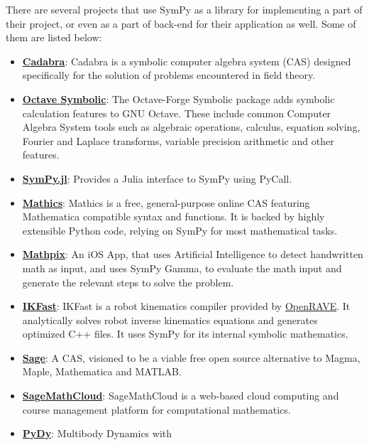 There are several projects that use SymPy as a library for implementing
a part of their project, or even as a part of back-end for their
application as well.
\newline
Some of them are listed below:

\begin{itemize}
\item
  \href{http://cadabra.science/index.html}{\textbf{Cadabra}}: Cadabra is
  a symbolic computer algebra system (CAS) designed specifically for the
  solution of problems encountered in field theory.
\item
  \href{http://octave.sourceforge.net/symbolic/}{\textbf{Octave Symbolic}}:
  The Octave-Forge Symbolic package adds symbolic calculation features
  to GNU Octave. These include common Computer Algebra System tools such
  as algebraic operations, calculus, equation solving, Fourier and
  Laplace transforms, variable precision arithmetic and other features.
\item
  \href{https://github.com/jverzani/SymPy.jl}{\textbf{SymPy.jl}}:
  Provides a Julia interface to SymPy using PyCall.
\item
  \href{https://mathics.github.io/}{\textbf{Mathics}}: Mathics is a
  free, general-purpose online CAS featuring Mathematica compatible
  syntax and functions. It is backed by highly extensible Python code,
  relying on SymPy for most mathematical tasks.
\item
  \href{http://mathpix.com/}{\textbf{Mathpix}}: An iOS App, that uses
  Artificial Intelligence to detect handwritten math as input, and uses
  SymPy Gamma, to evaluate the math input and generate the relevant
  steps to solve the problem.
\item
  \href{http://openrave.org/docs/0.8.2/openravepy/ikfast/}{\textbf{IKFast}}:
  IKFast is a robot kinematics compiler provided by
  \href{http://openrave.org/}{OpenRAVE}. It analytically solves robot inverse
  kinematics equations and generates optimized C++ files. It uses SymPy for
  its internal symbolic mathematics.
\item
  \href{http://www.sagemath.org/}{\textbf{Sage}}: A CAS, visioned to be
  a viable free open source alternative to Magma, Maple, Mathematica and
  MATLAB.
\item
  \href{https://cloud.sagemath.com}{\textbf{SageMathCloud}}:
  SageMathCloud is a web-based cloud computing and course management
  platform for computational mathematics.
\item
  \href{http://www.pydy.org/}{\textbf{PyDy}}: Multibody Dynamics with

\end{itemize}
